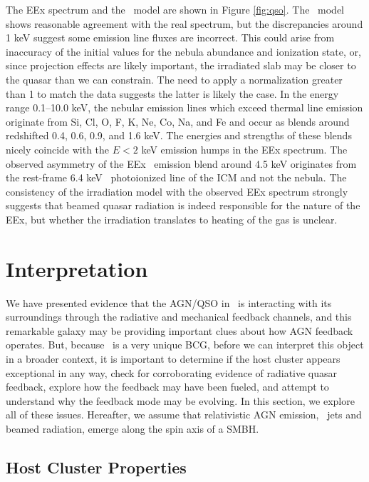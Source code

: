 \documentclass[referee,traditabstract]{aa}
\begin{document}
The EEx spectrum and the \cloudy\ model are shown in Figure
\ref{fig:qso}. The \cloudy\ model shows reasonable agreement with the
real spectrum, but the discrepancies around 1 keV suggest some
emission line fluxes are incorrect. This could arise from inaccuracy
of the initial values for the nebula abundance and ionization state,
or, since projection effects are likely important, the irradiated slab
may be closer to the quasar than we can constrain. The need to apply a
normalization greater than 1 to match the data suggests the latter is
likely the case. In the energy range 0.1--10.0 keV, the nebular
emission lines which exceed thermal line emission originate from Si,
Cl, O, F, K, Ne, Co, Na, and Fe and occur as blends around redshifted
0.4, 0.6, 0.9, and 1.6 keV. The energies and strengths of these blends
nicely coincide with the $E < 2$ keV emission humps in the EEx
spectrum. The observed asymmetry of the EEx \feka\ emission blend
around 4.5 keV originates from the rest-frame 6.4 keV
\feka\ photoionized line of the ICM and not the nebula. The
consistency of the irradiation model with the observed EEx spectrum
strongly suggests that beamed quasar radiation is indeed responsible
for the nature of the EEx, but whether the irradiation translates to
heating of the gas is unclear.

\section{Interpretation}
\label{sec:interp}

We have presented evidence that the AGN/QSO in \irs\ is interacting
with its surroundings through the radiative and mechanical feedback
channels, and this remarkable galaxy may be providing important clues
about how AGN feedback operates. But, because \irs\ is a very unique
BCG, before we can interpret this object in a broader context, it is
important to determine if the host cluster appears exceptional in any
way, check for corroborating evidence of radiative quasar feedback,
explore how the feedback may have been fueled, and attempt to
understand why the feedback mode may be evolving. In this section, we
explore all of these issues. Hereafter, we assume that relativistic
AGN emission, \eg\ jets and beamed radiation, emerge along the spin
axis of a SMBH.

\subsection{Host Cluster Properties}
\end{document}
